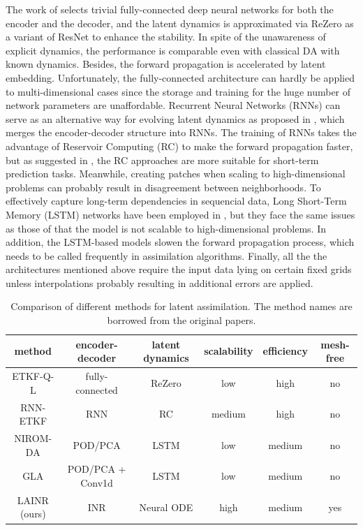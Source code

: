\documentclass{article}
\begin{document}
The work of \cite{Peyron2021LAwithAE} selects trivial fully-connected deep neural networks for both the encoder and the decoder, and the latent dynamics is approximated via ReZero\cite{bachlechner2021rezero} as a variant of ResNet\cite{He2015ResNet} to enhance the stability. In spite of the unawareness of explicit dynamics, the performance is comparable even with classical DA with known dynamics. Besides, the forward propagation is accelerated by latent embedding. Unfortunately, the fully-connected architecture can hardly be applied to multi-dimensional cases since the storage and training for the huge number of network parameters are unaffordable. Recurrent Neural Networks (RNNs) can serve as an alternative way for evolving latent dynamics as proposed in \cite{LatentspaceDA-RNN}, which merges the encoder-decoder structure into RNNs. The training of RNNs takes the advantage of Reservoir Computing (RC) \cite{ReservoirComputing} to make the forward propagation faster, but as suggested in \cite{Arcomano2020MLGAFM,LatentspaceDA-RNN}, the RC approaches are more suitable for short-term prediction tasks. Meanwhile, creating patches when scaling to high-dimensional problems can probably result in disagreement between neighborhoods. To effectively capture long-term dependencies in sequencial data, Long Short-Term Memory (LSTM) networks have been employed in \cite{ROM-DA,GeneralizedLA}, but they face the same issues as those of \cite{Peyron2021LAwithAE} that the model is not scalable to high-dimensional problems. In addition, the LSTM-based models slowen the forward propagation process, which needs to be called frequently in assimilation algorithms. Finally, all the the architectures mentioned above require the input data lying on certain fixed grids unless interpolations probably resulting in additional errors are applied.
\renewcommand{\arraystretch}{1.2}
\begin{table}
	\centering
	\begin{tabular}{c|c|c|c|c|c}
		\hline
		method                            & encoder-decoder  & latent dynamics & scalability & efficiency & mesh-free \\
		\hline
		ETKF-Q-L\cite{Peyron2021LAwithAE} & fully-connected  & ReZero          & low         & high       & no        \\
		RNN-ETKF\cite{LatentspaceDA-RNN}  & RNN              & RC              & medium      & high       & no        \\
		NIROM-DA\cite{ROM-DA}             & POD/PCA          & LSTM            & low         & medium     & no        \\
		GLA \cite{GeneralizedLA}          & POD/PCA + Conv1d & LSTM            & low         & medium     & no        \\
		LAINR (ours)                      & INR              & Neural ODE      & high        & medium     & yes       \\
		\hline
	\end{tabular}
	\caption{Comparison of different methods for latent assimilation. The method names are borrowed from the original papers.}
	\label{tab:related_works}
\end{table}
\renewcommand{\arraystretch}{1.0}
\end{document}
